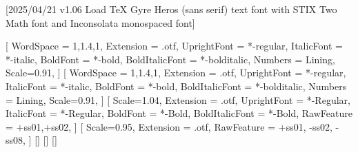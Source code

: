 
[2025/04/21 v1.06 Load TeX Gyre Heros (sans serif) text font with STIX Two Math font and Inconsolata monospaced font]

%
%
\ifpdftex
	\RequirePackage[T1]{fontenc}
	\RequirePackage{bm}
\else
    \RequirePackage[warnings-off={mathtools-colon,mathtools-overbracket}]{unicode-math}

    \setmainfont{texgyreheros}[
		WordSpace = {1,1.4,1},
		Extension = .otf,
    	UprightFont = *-regular,
    	ItalicFont = *-italic,
    	BoldFont = *-bold,
    	BoldItalicFont = *-bolditalic,
		Numbers = Lining,
    	Scale=0.91,
	]        
    \setsansfont{texgyreheros}[
		WordSpace = {1,1.4,1},
		Extension = .otf,
    	UprightFont = *-regular,
    	ItalicFont = *-italic,
    	BoldFont = *-bold,
    	BoldItalicFont = *-bolditalic,
		Numbers = Lining,
    	Scale=0.91,
	]        
   \setmonofont{Inconsolatazi4}[
        Scale=1.04,
        Extension = .otf,
        UprightFont = *-Regular,
        ItalicFont = *-Regular,%
        BoldFont = *-Bold, 
    	BoldItalicFont = *-Bold,%
        RawFeature = {+ss01,+ss02}, %
    ]             
    [%
    	Scale=0.95,%
    	Extension = .otf,
    	RawFeature = {+ss01, -ss02, -ss08},
    ]
    \setmathfontface{}[]%
    \setmathfontface{}[]
    \setmathfontface{}[]%
    \newcommand*{\FRAC}[1]{{\addfontfeature{Fractions=On}#1}}%
\fi
